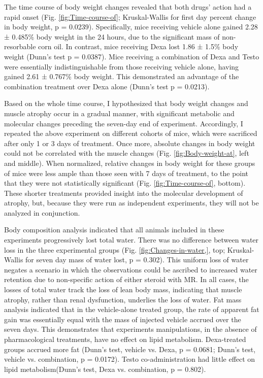\documentclass[12pt,english]{report}\usepackage[]{graphicx}\usepackage[]{color}
\begin{document}
The time course of body weight changes revealed that both drugs' action
had a rapid onset (Fig. \ref{fig:Time-course-of}; Kruskal-Wallis
for first day percent change in body weight, p = 0.0239).
Specifically, mice receiving vehicle alone gained 2.28
± 0.485\%
body weight in the 24 hours, due to the significant mass of non-resorbable
corn oil. In contrast, mice receiving Dexa lost 1.86
± 1.5\%
body weight (Dunn's test p = 0.0387).
Mice receiving a combination of Dexa and Testo were essentially indistinguishable
from those receiving vehicle alone, having gained 2.61
± 0.767\%
body weight. This demonstrated an advantage of the combination treatment
over Dexa alone (Dunn's test p = 0.0213).

Based on the whole time course, I hypothesized that body weight changes
and muscle atrophy occur in a gradual manner, with significant metabolic
and molecular changes preceding the seven-day end of experiment. Accordingly,
I repeated the above experiment on different cohorts of mice, which
were sacrificed after only 1 or 3 days of treatment. Once more, absolute
changes in body weight could not be correlated with the muscle changes
(Fig. \ref{fig:Body-weight-at}, left and middle). When normalized,
relative changes in body weight for these groups of mice were less
ample than those seen with 7 days of treatment, to the point that
they were not statistically significant (Fig. \ref{fig:Time-course-of},
bottom). These shorter treatments provided insight into the molecular
development of atrophy, but, because they were run as independent
experiments, they will not be analyzed in conjunction.

Body composition analysis indicated that all animals included in these
experiments progressively lost total water. There was no difference
between water loss in the three experimental groups (Fig. \ref{fig:Changes-in-water,},
top; Kruskal-Wallis for seven day mass of water lost, p = 0.302).
This uniform loss of water negates a scenario in which the observations
could be ascribed to increased water retention due to non-specific
action of either steroid with MR. In all cases, the losses of total
water track the loss of lean body mass, indicating that muscle atrophy,
rather than renal dysfunction, underlies the loss of water. Fat mass
analysis indicated that in the vehicle-alone treated group, the rate
of apparent fat gain was essentially equal with the mass of injected
vehicle accrued over the seven days. This demonstrates that experiments
manipulations, in the absence of pharmacological treatments, have
no effect on lipid metabolism. Dexa-treated groups accrued more fat
(Dunn's test, vehicle vs. Dexa, p = 0.0681;
Dunn's test, vehicle vs. combination, p = 0.0172).
Testo co-administration had little effect on lipid metabolism(Dunn's
test, Dexa vs. combination, p = 0.802).
\end{document}
